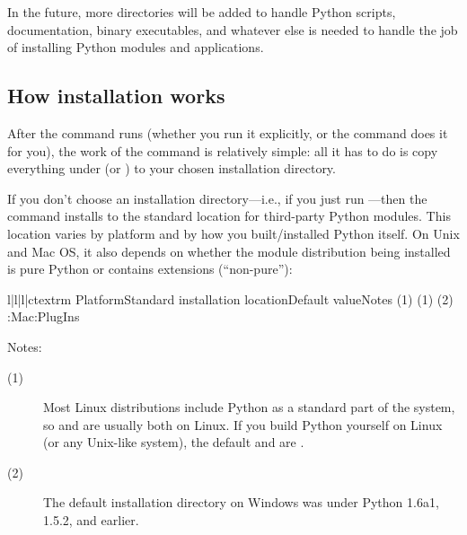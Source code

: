 \documentclass{howto}
\begin{document}
In the future, more directories will be added to handle Python scripts,
documentation, binary executables, and whatever else is needed to handle
the job of installing Python modules and applications.


\subsection{How installation works}

After the  command runs (whether you run it explicitly,
or the  command does it for you), the work of the
 command is relatively simple: all it has to do is copy
everything under  (or )
to your chosen installation directory.

If you don't choose an installation directory---i.e., if you just run
---then the  command installs to
the standard location for third-party Python modules.  This location
varies by platform and by how you built/installed Python itself.  On
Unix and Mac OS, it also depends on whether the module distribution
being installed is pure Python or contains extensions (``non-pure''):
\begin{tableiv}{l|l|l|c}{textrm}%
  {Platform}{Standard installation location}{Default value}{Notes}
          {}
          {}
          {(1)}
          {}
          {}
          {(1)}
          {}
          {}
          {(2)}
          {}
          {  }
          {}
          {:Mac:PlugIns}
          {}
          {}
\end{tableiv}

\noindent Notes:
\begin{description}
\item[(1)] Most Linux distributions include Python as a standard part of
  the system, so  and  are usually
  both  on Linux.  If you build Python yourself on Linux (or
  any Unix-like system), the default  and
   are .
\item[(2)] The default installation directory on Windows was
   under
  Python 1.6a1, 1.5.2, and earlier.
\end{description}
\end{document}
